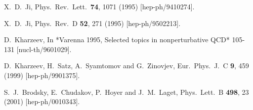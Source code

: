 \documentclass[12pt]{article}
\begin{document}
\begin{thebibliography}{99}




  X.~D.~Ji,
  Phys.\ Rev.\ Lett.\  {\bf 74}, 1071 (1995)
  [hep-ph/9410274].
 
  X.~D.~Ji,
  Phys.\ Rev.\ D {\bf 52}, 271 (1995)
  [hep-ph/9502213].
  
  D.~Kharzeev,
  In *Varenna 1995, Selected topics in nonperturbative QCD* 105-131
  [nucl-th/9601029].
 
  D.~Kharzeev, H.~Satz, A.~Syamtomov and G.~Zinovjev,
  Eur.\ Phys.\ J.\ C {\bf 9}, 459 (1999)
  [hep-ph/9901375].
 
  S.~J.~Brodsky, E.~Chudakov, P.~Hoyer and J.~M.~Laget,
  Phys.\ Lett.\ B {\bf 498}, 23 (2001)
  [hep-ph/0010343].






\end{thebibliography}
\end{document}
